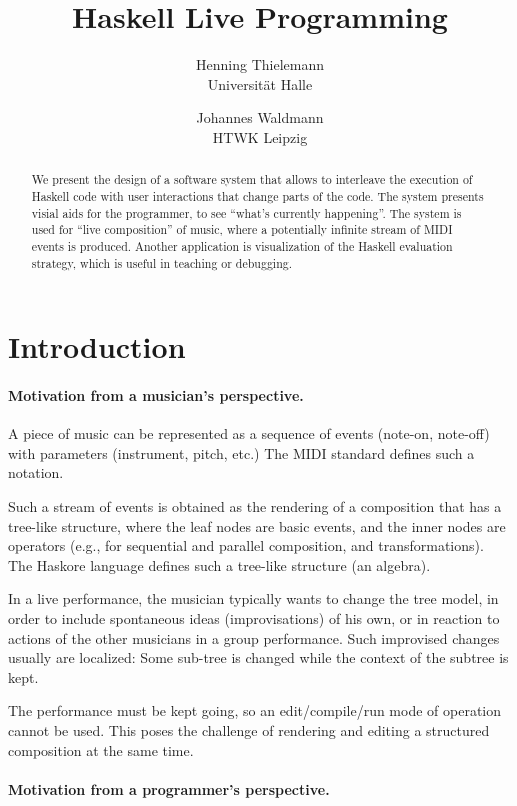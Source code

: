 \documentclass[a4paper]{easychair}
\title{Haskell Live Programming}
\author{
  Henning Thielemann \\ Universität Halle 
  \and
  Johannes Waldmann \\ HTWK Leipzig
}
\begin{document}
\maketitle

\begin{abstract}
  We present the design of a software system 
  that allows to interleave the execution of Haskell code
  with user interactions that change parts of the code.
  The system presents visial aids for the programmer,
  to see ``what's currently happening''.
  The system is used for ``live composition'' of music,
  where a potentially infinite stream of MIDI events is produced.
  Another application is visualization of the Haskell
  evaluation strategy, which is useful in  teaching or debugging.
\end{abstract}

\section{Introduction}

\paragraph{Motivation from a musician's perspective.}

A piece of music can be represented as a sequence of events
(note-on, note-off) with parameters (instrument, pitch, etc.)
The MIDI standard \cite{mma:midispec} defines such a notation.

Such a stream of events is obtained as the rendering
of a composition that has a tree-like structure,
where the leaf nodes are basic events,
and the inner nodes are operators (e.g., for
sequential and parallel composition, and transformations).
The Haskore language \cite{hudak:theory} defines such a tree-like structure
(an algebra).

In a live performance, the musician typically wants to change
the tree model, in order to include spontaneous ideas
(improvisations) of his own, or in reaction to actions of
the other musicians in a group performance.
Such improvised changes usually are localized: Some
sub-tree is changed while the context of the subtree is kept.

The performance must be kept going, so an edit/compile/run mode
of operation cannot be used. This poses the challenge of
rendering and editing a structured composition at the same time.

\paragraph{Motivation from a programmer's perspective.}
\end{document}
